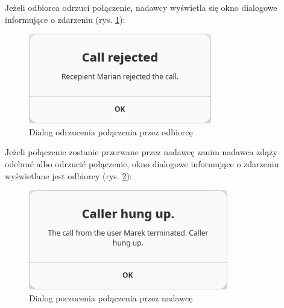 Jeżeli odbiorca odrzuci połączenie, nadawcy wyświetla się okno dialogowe informujące o zdarzeniu
(rys. \ref{fig:screen_recepient_reject}):

\begin{figure}[H]
    \centering
    \includegraphics[width=.4\textwidth]{img/gui/screen_recepient_reject}
    \caption{Dialog odrzucenia połączenia przez odbiorcę}
    \label{fig:screen_recepient_reject}
\end{figure}

Jeżeli połączenie zostanie przerwane przez nadawcę zanim nadawca zdąży odebrać albo odrzucić
połączenie, okno dialogowe informujące o zdarzeniu wyświetlane jest odbiorcy (rys. \ref{fig:screen_caller_hungup}):

\begin{figure}[H]
    \centering
    \includegraphics[width=.4\textwidth]{img/gui/screen_caller_hungup}
    \caption{Dialog porzucenia połączenia przez nadawcę}
    \label{fig:screen_caller_hungup}
\end{figure}
